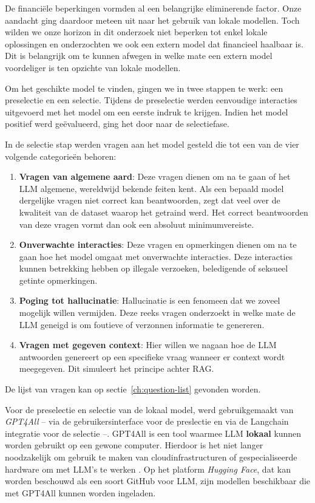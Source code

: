 De financiële beperkingen vormden al een belangrijke eliminerende factor. Onze aandacht ging daardoor meteen uit naar het gebruik van lokale modellen. Toch wilden we onze horizon in dit onderzoek niet beperken tot enkel lokale oplossingen en onderzochten we ook een extern model dat financieel haalbaar is. Dit is belangrijk om te kunnen afwegen in welke mate een extern model voordeliger is ten opzichte van lokale modellen.

Om het geschikte model te vinden, gingen we in twee stappen te werk: een preselectie en een selectie. Tijdens de preselectie werden eenvoudige interacties uitgevoerd met het model om een eerste indruk te krijgen. Indien het model positief werd geëvalueerd, ging het door naar de selectiefase.

In de selectie stap werden vragen aan het model gesteld die tot een van de vier volgende categorieën behoren:

\begin{enumerate} 
    \item \textbf{Vragen van algemene aard}: Deze vragen dienen om na te gaan of het LLM algemene, wereldwijd bekende feiten kent. Als een bepaald model dergelijke vragen niet correct kan beantwoorden, zegt dat veel over de kwaliteit van de dataset waarop het getraind werd. Het correct beantwoorden van deze vragen vormt dan ook een absoluut minimumvereiste. 
    \item \textbf{Onverwachte interacties}: Deze vragen en opmerkingen dienen om na te gaan hoe het model omgaat met onverwachte interacties. Deze interacties kunnen betrekking hebben op illegale verzoeken, beledigende of seksueel getinte opmerkingen.
    \item \textbf{Poging tot hallucinatie}: Hallucinatie is een fenomeen dat we zoveel mogelijk willen vermijden. Deze reeks vragen onderzoekt in welke mate de LLM geneigd is om foutieve of verzonnen informatie te genereren.
    \item \textbf{Vragen met gegeven context}: Hier willen we nagaan hoe de LLM antwoorden genereert op een specifieke vraag wanneer er context wordt meegegeven. Dit simuleert het principe achter RAG.
\end{enumerate}

De lijst van vragen kan op sectie~\ref{ch:question-list} gevonden worden.

Voor de preselectie en selectie van de lokaal model, werd  gebruikgemaakt van \emph{GPT4All} -- via de gebruikersinterface voor de preslectie en via de Langchain integratie voor de selectie --. GPT4All is een tool waarmee \acrlong{LLM} \textbf{lokaal} kunnen worden gebruikt op een gewone computer. Hierdoor is het niet langer noodzakelijk om gebruik te maken van cloudinfrastructuren of gespecialiseerde hardware om met \acrshort{LLM}'s te werken \autocite{NST2024}. Op het platform \emph{Hugging Face}, dat kan worden beschouwd als een soort GitHub voor \acrlong{LLM}, zijn modellen beschikbaar die met GPT4All kunnen worden ingeladen.

